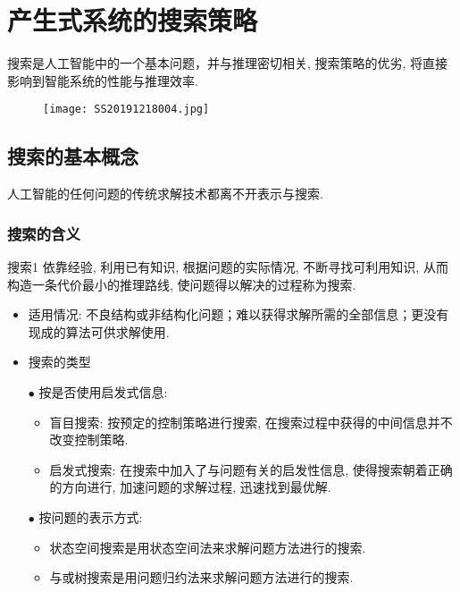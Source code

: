 \chapter{产生式系统的搜索策略}\label{AIchap4}
\begin{tcolorbox}[colback=white!50,colframe=orange!50,title=搜索]
搜索是人工智能中的一个基本问题，并与推理密切相关, 搜索策略的优劣, 将直接影响到智能系统的性能与推理效率.\hfill
\end{tcolorbox}
\begin{figure}[H]
\centering
\texttt{[image: SS20191218004.jpg]}
\label{SS20191218004}
\end{figure}
\section{搜索的基本概念}
    人工智能的任何问题的传统求解技术都离不开表示与搜索.
\subsection{搜索的含义}
\begin{mydef}{搜索}{1}
依靠经验, 利用已有知识, 根据问题的实际情况, 不断寻找可利用知识, 从而构造一条代价最小的推理路线, 使问题得以解决的过程称为搜索.
\end{mydef}

\begin{itemize}
\item 适用情况: 不良结构或非结构化问题；难以获得求解所需的全部信息；更没有现成的算法可供求解使用.
\item 搜索的类型

    $\bullet$ 按是否使用启发式信息:
    \begin{itemize}
        \item 盲目搜索: 按预定的控制策略进行搜索, 在搜索过程中获得的中间信息并不改变控制策略.
        \item 启发式搜索: 在搜索中加入了与问题有关的启发性信息, 使得搜索朝着正确的方向进行, 加速问题的求解过程, 迅速找到最优解.
    \end{itemize}
    $\bullet$ 按问题的表示方式:
    \begin{itemize}
        \item 状态空间搜索是用状态空间法来求解问题方法进行的搜索.
        \item 与或树搜索是用问题归约法来求解问题方法进行的搜索.
    \end{itemize}
\end{itemize}

